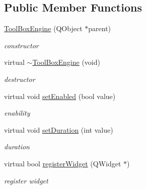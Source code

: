 \subsection*{Public Member Functions}
\begin{DoxyCompactItemize}
\item 
\mbox{\label{class_tool_box_engine_a443b6c4b881a733a2d38d21c7d3c8767}} 
\hyperlink{class_tool_box_engine_a443b6c4b881a733a2d38d21c7d3c8767}{Tool\+Box\+Engine} (Q\+Object $\ast$parent)
\begin{DoxyCompactList}\small\item\em constructor \end{DoxyCompactList}\item 
\mbox{\label{class_tool_box_engine_a5726e742a7203da8ad8eb366386ccef5}} 
virtual \hyperlink{class_tool_box_engine_a5726e742a7203da8ad8eb366386ccef5}{$\sim$\+Tool\+Box\+Engine} (void)
\begin{DoxyCompactList}\small\item\em destructor \end{DoxyCompactList}\item 
\mbox{\label{class_tool_box_engine_a358fad4302ebf76008053d14c4e1fbd9}} 
virtual void \hyperlink{class_tool_box_engine_a358fad4302ebf76008053d14c4e1fbd9}{set\+Enabled} (bool value)
\begin{DoxyCompactList}\small\item\em enability \end{DoxyCompactList}\item 
\mbox{\label{class_tool_box_engine_a5a3877f7d9100beb0f40aecc10c0712a}} 
virtual void \hyperlink{class_tool_box_engine_a5a3877f7d9100beb0f40aecc10c0712a}{set\+Duration} (int value)
\begin{DoxyCompactList}\small\item\em duration \end{DoxyCompactList}\item 
\mbox{\label{class_tool_box_engine_acfcacb5ba63d54f65c29a79ec7687581}} 
virtual bool \hyperlink{class_tool_box_engine_acfcacb5ba63d54f65c29a79ec7687581}{register\+Widget} (Q\+Widget $\ast$)
\begin{DoxyCompactList}\small\item\em register widget \end{DoxyCompactList}\item 

\end{DoxyCompactItemize}
